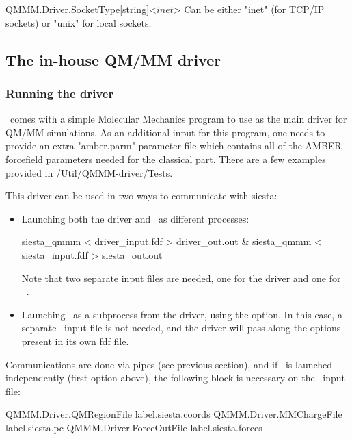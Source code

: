  \begin{fdfentry}{QMMM.Driver.SocketType}[string]<$inet$>
  Can be either "inet" (for TCP/IP sockets) or "unix" for local sockets.

 \end{fdfentry}


 \subsection{The in-house QM/MM driver}
 \subsubsection{Running the driver}
 \siesta\ comes with a simple Molecular Mechanics program to use as the
 main driver for QM/MM simulations. As an additional input for this program,
 one needs to provide an extra "amber.parm" parameter file which contains
 all of the AMBER forcefield parameters needed for the classical part. There
 are a few examples provided in /Util/QMMM-driver/Tests.

 This driver can be used in two ways to communicate with siesta:
\begin{itemize}
  \item Launching both the driver and \siesta\ as different processes:

  \begin{shellexample}
    siesta_qmmm < driver_input.fdf > driver_out.out &
    siesta_qmmm < siesta_input.fdf > siesta_out.out
  \end{shellexample}

  Note that two separate input files are needed, one for the driver and
  one for \siesta\ .

  \item Launching \siesta\ as a subprocess from the driver, using
  the  option. In this case, a separate \siesta\ input
  file is not needed, and the driver will pass along the options present
  in its own fdf file.
\end{itemize}

  Communications are done via pipes (see previous section), and if \siesta\
  is launched independently (first option above), the following block is
  necessary on the \siesta\ input file:

  \begin{shellexample}
    QMMM.Driver.QMRegionFile {label}.siesta.coords
    QMMM.Driver.MMChargeFile {label}.siesta.pc
    QMMM.Driver.ForceOutFile {label}.siesta.forces
  \end{shellexample}

